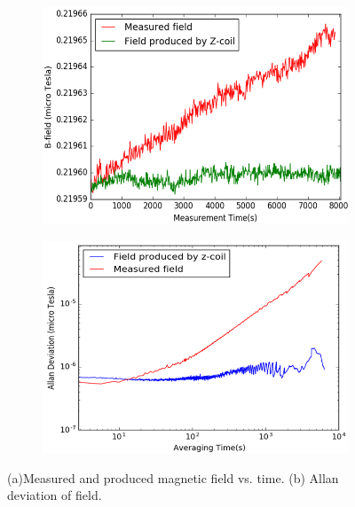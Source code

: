 \begin{itemize}
\begin{figure}
    \begin{subfigure}[b]{0.65\textwidth}
        \centering
        \includegraphics[width=\textwidth]{figures/field_coil_current.png}
        \caption{}
        \label{fig:field_measure_and_produced}
    \end{subfigure}
    \begin{subfigure}[b]{0.65\textwidth}
        \centering
        \includegraphics[width=\textwidth]{figures/field_current_allan_plot.png}
        \caption{}
        \label{fig:allan_plot}
    \end{subfigure}
    \caption{(a)Measured and produced magnetic field vs. time. (b) Allan deviation of field.}
    \label{fig:current_vs_field_allan_deviation}
\end{figure} 


\end{itemize}
